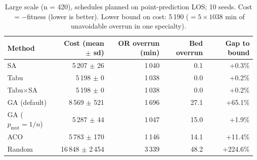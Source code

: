 \begin{table}[h]
\centering
\begin{tabular}{lrrrr}
\toprule
Method & Cost (mean $\pm$ sd) & OR overrun (min) & Bed overrun & Gap to bound \\
\midrule
SA & 5\,207 $\pm$ 26 & 1\,040 & 0.1 & +0.3\% \\
Tabu & 5\,198 $\pm$ 0 & 1\,038 & 0.0 & +0.2\% \\
Tabu$\times$SA & 5\,198 $\pm$ 0 & 1\,038 & 0.0 & +0.2\% \\
GA (default) & 8\,569 $\pm$ 521 & 1\,696 & 27.1 & +65.1\% \\
GA ($p_{\mathrm{mut}}=1/n$) & 5\,287 $\pm$ 44 & 1\,047 & 15.0 & +1.9\% \\
ACO & 5\,783 $\pm$ 170 & 1\,146 & 14.1 & +11.4\% \\
Random & 16\,848 $\pm$ 2\,454 & 3\,339 & 48.2 & +224.6\% \\
\bottomrule
\end{tabular}
\caption{Large scale (n = 420), schedules planned on point-prediction LOS; 10 seeds. Cost $=-$fitness (lower is better). Lower bound on cost: 5\,190 ($= 5 \times 1038$ min of unavoidable overrun in one specialty).}
\label{tab:quality}
\end{table}
